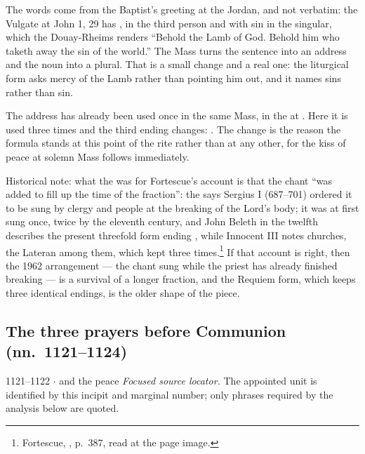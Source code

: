 The words come from the Baptist's greeting at the Jordan, and not verbatim: the
Vulgate at John 1, 29 has , in the third person and with sin in the singular, which the
Douay-Rheims renders ``Behold the Lamb of God. Behold him who taketh away the
sin of the world.'' The Mass turns the sentence into an address and the noun
into a plural. That is a small change and a real one: the liturgical form asks
mercy of the Lamb rather than pointing him out, and it names sins rather than
sin.

The address has already been used once in the same Mass, in the
 at . Here
it is used three times and the third ending changes: . The change is the reason the formula stands at this point of the rite
rather than at any other, for the kiss of peace at solemn Mass follows
immediately.

\begin{witnesscard}{Historical note: what the  was for}
Fortescue's account is that the chant ``was added to fill up the time of the
fraction'': the  says Sergius I (687--701) ordered it
to be sung by clergy and people at the breaking of the Lord's body; it was at
first sung once, twice by the eleventh century, and John Beleth in the twelfth
describes the present threefold form ending , while
Innocent III notes churches, the Lateran among them, which kept
 three times.\footnote{Fortescue, ,
p.~387, read at the page image.} If that account is right, then the 1962
arrangement --- the chant sung while the priest has already finished breaking
--- is a survival of a longer fraction, and the Requiem form, which keeps three
identical endings, is the older shape of the piece.
\end{witnesscard}

\subsection*{The three prayers before Communion (nn.~1121--1124)}

\begin{appointed}{1121--1122 $\cdot$  and the peace}
\textit{Focused source locator.} The appointed unit is identified by this incipit and marginal number; only phrases required by the analysis below are quoted.
\end{appointed}

